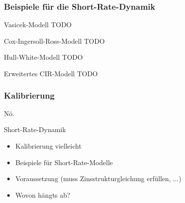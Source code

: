 \subsubsection{Beispiele für die Short-Rate-Dynamik}

\begin{example}[Momentanzinsmodell]{Vasicek-Modell}
    TODO
\end{example}

\begin{example}[Momentanzinsmodell]{Cox-Ingersoll-Ross-Modell}
    TODO
\end{example}

\begin{example}[Momentanzinsmodell]{Hull-White-Modell}
    TODO
\end{example}

\begin{example}[Momentanzinsmodell]{Erweitertes CIR-Modell}
    TODO
\end{example}

\subsubsection{Kalibrierung}

Nö.

\begin{info}{Short-Rate-Dynamik}
    \begin{itemize}
        \item Kalibrierung vielleicht
        \item Beispiele für Short-Rate-Modelle
        \item Voraussetzung (muss Zinsstrukturgleichung erfüllen, ...)
        \item Wovon hängts ab?
    \end{itemize}
\end{info}
